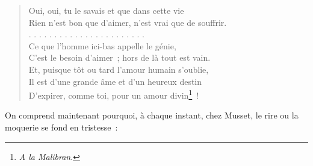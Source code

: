 \documentclass[french,twoside]{book} %
\begin{document}
\begin{verse}
Oui, oui, tu le savais et que dans cette vie\\
Rien n’est bon que d’aimer, n’est vrai que de souffrir.\\
. . . . . . . . . . . . . . . . . . . . . . .\\
Ce que l’homme ici-bas appelle le génie,\\
C’est le besoin d’aimer ; hors de là tout est vain.\\
Et, puisque tôt ou tard l’amour humain s’oublie,\\
Il est d’une grande âme et d’un heureux destin\\
D’expirer, comme toi, pour un amour divin\footnote{\emph{A la Malibran}.} !\\
\end{verse}

\noindent On comprend maintenant pourquoi, à chaque instant, chez Musset, le rire ou la moquerie se fond en tristesse :\par
\end{document}
